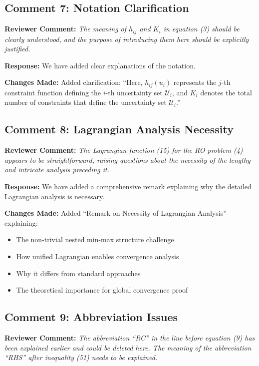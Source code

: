 \documentclass[11pt]{article}
\newcommand{\reviewercomment}[1]{\textbf{Reviewer Comment:} \textit{#1}}
\newcommand{\response}[1]{\textbf{Response:} #1}
\newcommand{\changes}[1]{\textbf{Changes Made:} #1}
\begin{document}
\subsection*{Comment 7: Notation Clarification}

\reviewercomment{The meaning of $h_{ij}$ and $K_i$ in equation (3) should be clearly understood, and the purpose of introducing them here should be explicitly justified.}

\response{We have added clear explanations of the notation.}

\changes{Added clarification: ``Here, $h_{ij}(u_i)$ represents the $j$-th constraint function defining the $i$-th uncertainty set $\mathcal{U}_i$, and $K_i$ denotes the total number of constraints that define the uncertainty set $\mathcal{U}_i$.''}

\subsection*{Comment 8: Lagrangian Analysis Necessity}

\reviewercomment{The Lagrangian function (15) for the RO problem (4) appears to be straightforward, raising questions about the necessity of the lengthy and intricate analysis preceding it.}

\response{We have added a comprehensive remark explaining why the detailed Lagrangian analysis is necessary.}

\changes{Added ``Remark on Necessity of Lagrangian Analysis'' explaining:
\begin{itemize}
\item The non-trivial nested min-max structure challenge
\item How unified Lagrangian enables convergence analysis
\item Why it differs from standard approaches
\item The theoretical importance for global convergence proof
\end{itemize}
}

\subsection*{Comment 9: Abbreviation Issues}

\reviewercomment{The abbreviation ``RC'' in the line before equation (9) has been explained earlier and could be deleted here. The meaning of the abbreviation ``RHS'' after inequality (51) needs to be explained.}
\end{document}
